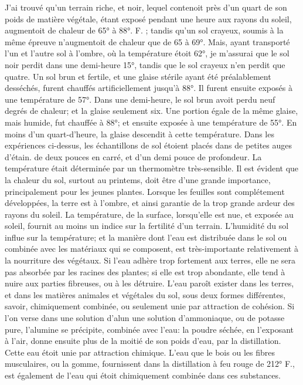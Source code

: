J'ai trouvé qu'un terrain riche, et noir, lequel contenoit près d'un quart de son poids de matière végétale, étant exposé pendant une heure aux rayons du soleil, augmentoit de chaleur de 65° à 88°. F. ; tandis qu'un sol crayeux, soumis à la même épreuve n'augmentoit de chaleur que de 65 à 69°.
Mais, ayant transporté l'un et l'autre sol à l'ombre, où la température étoit 62°, je m'assurai que le sol noir perdit dans une demi-heure 15°, tandis que le sol crayeux n'en perdit que quatre.
Un sol brun et fertile, et une glaise stérile ayant été préalablement desséchés, furent chauffés artificiellement jusqu'à 88°. Il furent ensuite exposés à une température de 57°. Dans une demi-heure, le sol brun avoit perdu neuf degrés de chaleur; et la glaise seulement six. Une portion égale de la même glaise, mais humide, fut chauffée à 88°; et ensuite exposée à une température de 55°. En moins d'un quart-d'heure, la glaise descendit à cette température. Dans les expériences ci-dessus, les échantillons de sol étoient placés dans de petites auges d'étain.\setcounter{page}{445} de deux pouces en carré, et d'un demi pouce de profondeur. La température était déterminée par un thermomètre très-sensible.
Il est évident que la chaleur du sol, surtout au printems, doit être d'une grande importance, principalement pour les jeunes plantes. Lorsque les feuilles sont complétement développées, la terre est à l'ombre, et ainsi garantie de la trop grande ardeur des rayons du soleil. La température, de la surface, lorsqu'elle est nue, et exposée au soleil, fournit au moins un indice sur la fertilité d'un terrain.
L'humidité du sol influe sur la température; et la manière dont l'eau est distribuée dans le sol ou combinée avec les matériaux qui se composent, est très-importante relativement à la nourriture des végétaux. Si l'eau adhère trop fortement aux terres, elle ne sera pas absorbée par les racines des plantes; si elle est trop abondante, elle tend à nuire aux parties fibreuses, ou à les détruire.
L'eau paroît exister dans les terres, et dans les matières animales et végétales du sol, sous deux formes différentes, savoir, chimiquement combinée, ou seulement unie par attraction de cohésion.
Si l'on verse dans une solution d'alun\setcounter{page}{446} une solution d'ammoniaque, ou de potasse pure, l'alumine se précipite, combinée avec l'eau: la poudre séchée, en l'exposant à l'air, donne ensuite plus de la moitié de son poids d'eau, par la distillation. Cette eau étoit unie par attraction chimique. L'eau que le bois ou les fibres musculaires, ou la gomme, fournissent dans la distillation à feu rouge de 212° F., est également de l'eau qui étoit chimiquement combinée dans ces substances.
